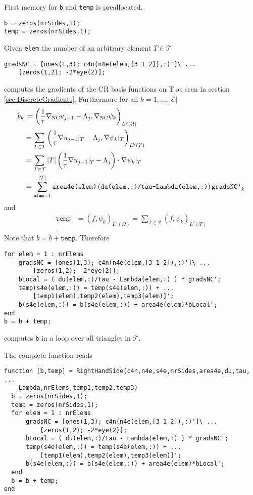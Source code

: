 First memory for \texttt{b} and \texttt{temp} is preallocated.
\begin{lstlisting}[frame=single,numbers=none]
b = zeros(nrSides,1);
temp = zeros(nrSides,1);
\end{lstlisting}
Given \texttt{elem} the number of an arbitrary element $T\in\mathcal T$
\begin{lstlisting}[frame=single,numbers=none]
gradsNC = [ones(1,3); c4n(n4e(elem,[3 1 2]),:)']\ ...
    [zeros(1,2); -2*eye(2)];
\end{lstlisting}
computes the gradients of the CR basis functions on T as seen in section 
\ref{sec:DiscreteGradients}. Furthermore 
for all $k=1,\dots,|\mathcal E|$
\begin{align*}
\tilde{b}_k 
&\coloneqq
\left(
\frac{1}{\tau}
\nabla_{\textup{NC}}u_{j-1}-\Lambda_j,\nabla_{\textup{NC}}\psi_k
\right)_{L^2(\Omega)}\\
&=
\sum_{T\in\mathcal T}
\left(
\frac{1}{\tau}
\nabla u_{j-1}|_T-\Lambda_j,\nabla \psi_k|_T
\right)_{L^2(T)} \\
&=
\sum_{T\in\mathcal T}
|T|
\left(\frac{1}{\tau}
\nabla u_{j-1}|_T-\Lambda_j\right)\cdot\nabla \psi_k|_T\\
&=
\sum_{\texttt{elem}=1}^{|\mathcal T|} \texttt{area4e(elem)}
\left(\texttt{du(elem,:)/tau-Lambda(elem,:)}\right)\texttt{gradsNC'}_k
\end{align*}
and
\begin{align*}
  \texttt{temp} &=(f,\psi_k)_{L^2(\Omega)} 
=\sum_{T\in\mathcal T}(f,\psi_k)_{L^2(T)} \\
.
\end{align*}
Note that $ b = \tilde{b}+\texttt{temp}.$
Therefore \begin{lstlisting}[frame=single,numbers=none]
for elem = 1 : nrElems
    gradsNC = [ones(1,3); c4n(n4e(elem,[3 1 2]),:)']\ ...
        [zeros(1,2); -2*eye(2)];
    bLocal = ( du(elem,:)/tau - Lambda(elem,:) ) * gradsNC';  
    temp(s4e(elem,:)) = temp(s4e(elem,:)) + ...
        [temp1(elem),temp2(elem),temp3(elem)]';
    b(s4e(elem,:)) = b(s4e(elem,:)) + area4e(elem)*bLocal'; 
end
b = b + temp;
\end{lstlisting}
computes \texttt{b} in a loop over all triangles in $\mathcal T$.

The complete function reads
\begin{lstlisting}[frame=single,numbers=none]
function [b,temp] = RightHandSide(c4n,n4e,s4e,nrSides,area4e,du,tau, ...
    Lambda,nrElems,temp1,temp2,temp3)
  b = zeros(nrSides,1);
  temp = zeros(nrSides,1);
  for elem = 1 : nrElems
      gradsNC = [ones(1,3); c4n(n4e(elem,[3 1 2]),:)']\ ...
          [zeros(1,2); -2*eye(2)];
      bLocal = ( du(elem,:)/tau - Lambda(elem,:) ) * gradsNC';  
      temp(s4e(elem,:)) = temp(s4e(elem,:)) + ...
          [temp1(elem),temp2(elem),temp3(elem)]';
      b(s4e(elem,:)) = b(s4e(elem,:)) + area4e(elem)*bLocal'; 
  end
  b = b + temp;
end
\end{lstlisting}

